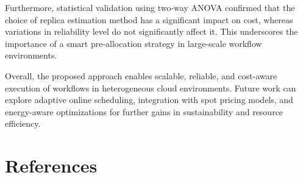 \documentclass[12pt]{tcc}
\begin{document}
Furthermore, statistical validation using two-way ANOVA confirmed that the choice of replica estimation method has a significant impact on cost, whereas variations in reliability level do not significantly affect it. This underscores the importance of a smart pre-allocation strategy in large-scale workflow environments.

Overall, the proposed approach enables scalable, reliable, and cost-aware execution of workflows in heterogeneous cloud environments. Future work can explore adaptive online scheduling, integration with spot pricing models, and energy-aware optimizations for further gains in sustainability and resource efficiency.

	
	\newcommand{\Extrachap}[1]{\chapter*{#1}\markboth{#1}{#1}%
		\addcontentsline{toc}{chapter}{#1}}
	
	\chapter*{References}
	
\end{document}
